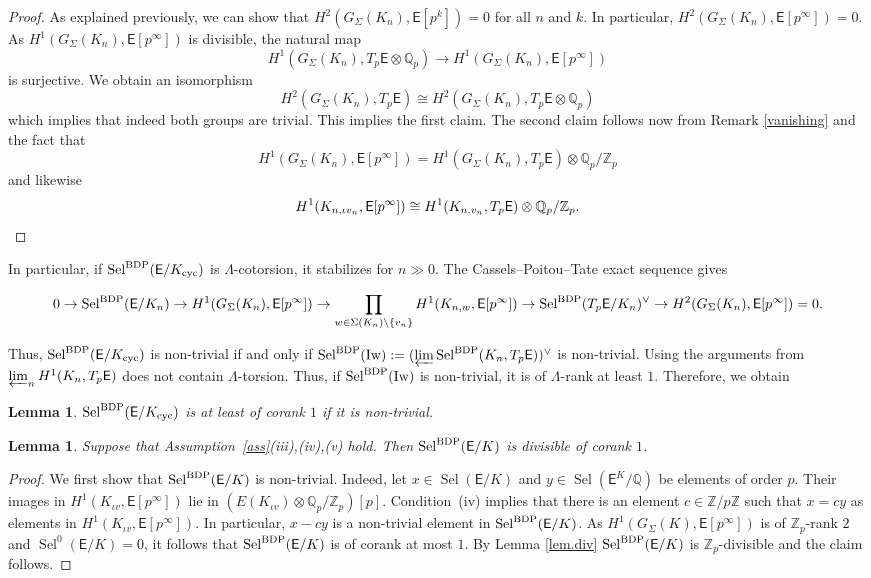 \documentclass{amsart}
\newtheorem{lemma}[theorem]{Lemma}
\numberwithin{equation}{section}
\theoremstyle{remark}
\newcommand{\cyc}{\operatorname{cyc}}
\newcommand{\Sel}{\operatorname{Sel}}
\newcommand{\SelBDP}{\operatorname{Sel}^{\textup{BDP}}}
\newcommand{\Z}{\mathbb{Z}}
\newcommand{\Q}{\mathbb{Q}}
\newcommand{\EC}{\mathsf{E}}
\theoremstyle{plain} %
\begin{document}
\begin{proof}
As explained previously, we can show that $H^2({G_{\Sigma}}(K_n), \EC[p^k])=0$ for all $n$ and $k$.
In particular, $H^2(G_\Sigma(K_n),\EC[p^\infty])=0$.
As $H^1(G_\Sigma(K_n),\EC[p^\infty])$ is divisible, the natural map 
\[
H^1(G_\Sigma(K_n),T_p\EC\otimes \Q_p)\longrightarrow H^1(G_\Sigma(K_n),\EC[p^\infty])
\]
is surjective.
We obtain an isomorphism
\[
H^2(G_\Sigma(K_n),T_p\EC)\cong H^2(G_\Sigma(K_n),T_p\EC\otimes \Q_p)
\]
which implies that indeed both groups are trivial.
This implies the first claim.
The second claim follows now from Remark \ref{vanishing} and the fact that 
\[
H^1({G_{\Sigma}}(K_n),\EC[p^\infty])=H^1({G_{\Sigma}}(K_n),T_p\EC)\otimes \Q_p/\Z_p 
\]
and likewise
\[
H^1(K_{n,\iota v_n},\EC[p^\infty])\cong H^1(K_{n,v_n},T_p\EC)\otimes \Q_p/\Z_p. \qedhere
\]
\end{proof}

In particular, if $\SelBDP(\EC/K_{\cyc})$ is ${\Lambda}$-cotorsion, it stabilizes for $n\gg 0$.
The Cassels--Poitou--Tate exact sequence gives
\begin{footnotesize}
\[
0\to \SelBDP(\EC/K_n)\to H^1({G_{\Sigma}}(K_n),\EC[p^\infty])\to \prod_{w\in \Sigma(K_n)\setminus\{v_n\}}H^1(K_{n,w},\EC[p^\infty])\to \SelBDP(T_p\EC/K_n)^\vee \to H^2({G_{\Sigma}}(K_n),\EC[p^\infty])=0.
\]
\end{footnotesize}
Thus, $\SelBDP(\EC/K_{\cyc})$ is non-trivial if and only if $\SelBDP(\text{Iw}):=(\varprojlim \SelBDP(K_n,T_p\EC))^\vee$ is non-trivial.
Using the arguments from \cite[lemma 2.6]{lei-lim} $\varprojlim_n H^1(K_n, T_p\EC)$ does not contain $\Lambda$-torsion.
Thus, if $\SelBDP(\text{Iw})$ is non-trivial, it is of $\Lambda$-rank at least $1$.
Therefore, we obtain

\begin{lemma}
\label{rankatleast}
$\SelBDP(\EC/K_{\cyc})$ is at least of corank $1$ if it is  non-trivial.
\end{lemma}

\begin{lemma}
\label{Selbdp}
Suppose that Assumption~\ref{ass}\textup{(}iii\textup{)},\textup{(}iv\textup{)},\textup{(}v\textup{)} hold.
Then $\SelBDP(\EC/K)$ is divisible of corank $1$.
\end{lemma}

\begin{proof}
We first show that $\SelBDP(\EC/K)$ is non-trivial.
Indeed, let $x\in \Sel(\EC/K)$ and $y\in \Sel(\EC^K/\Q)$ be elements of order $p$.
Their images in $H^1(K_{\iota v},\EC[p^\infty])$ lie in $(E(K_{\iota v})\otimes \Q_p/\Z_p)[p]$.
Condition~(iv) implies that there is an element $c\in \Z/p\Z$ such that $x=cy$ as elements in $H^1(K_{\iota v},\EC[p^\infty])$.
In particular, $x-cy$ is a non-trivial element in $\SelBDP(\EC/K)$.
As $H^1(G_\Sigma(K),\EC[p^\infty])$ is of $\Z_p$-rank $2$ and $\Sel^0(\EC/K)=0$, it follows that $\SelBDP(\EC/K)$ is of corank at most $1$.
By Lemma \ref{lem.div} $\SelBDP(\EC/K)$ is $\Z_p$-divisible and the claim follows.
\end{proof}
\end{document}
